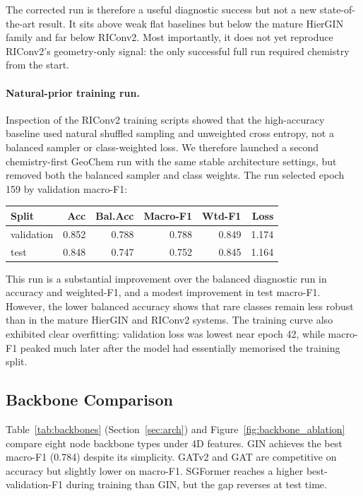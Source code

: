 The corrected run is therefore a useful diagnostic success but not a new
state-of-the-art result.
It sits above weak flat baselines but below the mature HierGIN family and far
below RIConv2.
Most importantly, it does not yet reproduce RIConv2's geometry-only signal:
the only successful full run required chemistry from the start.

\paragraph{Natural-prior training run.}
Inspection of the RIConv2 training scripts showed that the high-accuracy
baseline used natural shuffled sampling and unweighted cross entropy, not a
balanced sampler or class-weighted loss.
We therefore launched a second chemistry-first GeoChem run with the same stable
architecture settings, but removed both the balanced sampler and class weights.
The run selected epoch 159 by validation macro-F1:

\begin{center}
\begin{tabular}{lrrrrr}
  \toprule
  \textbf{Split} & \textbf{Acc} & \textbf{Bal.Acc} & \textbf{Macro-F1} & \textbf{Wtd-F1} & \textbf{Loss} \\
  \midrule
  validation & 0.852 & 0.788 & 0.788 & 0.849 & 1.174 \\
  test       & 0.848 & 0.747 & 0.752 & 0.845 & 1.164 \\
  \bottomrule
\end{tabular}
\end{center}

This run is a substantial improvement over the balanced diagnostic run in
accuracy and weighted-F1, and a modest improvement in test macro-F1.
However, the lower balanced accuracy shows that rare classes remain less
robust than in the mature HierGIN and RIConv2 systems.
The training curve also exhibited clear overfitting: validation loss was lowest
near epoch 42, while macro-F1 peaked much later after the model had essentially
memorised the training split.

\subsection{Backbone Comparison}

Table~\ref{tab:backbones} (Section~\ref{sec:arch}) and
Figure~\ref{fig:backbone_ablation} compare eight node backbone types under
4D features.
GIN achieves the best macro-F1 (0.784) despite its simplicity.
GATv2 and GAT are competitive on accuracy but slightly lower on macro-F1.
SGFormer reaches a higher best-validation-F1 during training than GIN, but
the gap reverses at test time.

